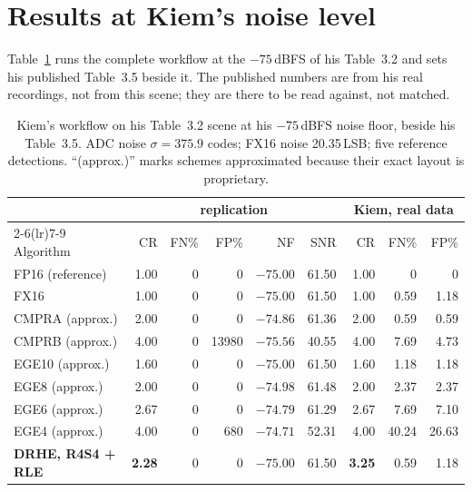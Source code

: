 \section{Results at Kiem's noise level}
\label{sec:kr_m75}

Table~\ref{tab:kr_m75} runs the complete workflow at the $-75$\,dBFS of his
Table~3.2 and sets his published Table~3.5 beside it. The published numbers are
from his real recordings, not from this scene; they are there to be read
against, not matched.

\begin{table}[htbp]
\centering
\caption[Replication at $-75$\,dBFS]{Kiem's workflow on his Table~3.2 scene at
his $-75$\,dBFS noise floor, beside his Table~3.5. ADC noise
$\sigma = 375.9$ codes; FX16 noise \num{20.35}\,LSB; five reference detections.
``(approx.)'' marks schemes approximated because their exact layout is
proprietary.}
\label{tab:kr_m75}
\footnotesize
\setlength{\tabcolsep}{3.5pt}
\begin{tabular}{@{}lrrrrr@{\hskip 12pt}rrr@{}}
\toprule
& \multicolumn{5}{c}{\textbf{replication}} & \multicolumn{3}{c}{\textbf{Kiem, real data}}\\
\cmidrule(lr){2-6}\cmidrule(lr){7-9}
Algorithm & CR & FN\% & FP\% & NF & SNR & CR & FN\% & FP\%\\
\midrule
FP16 (reference)                   & 1.00 & 0 & 0 & $-75.00$ & 61.50 & 1.00 & 0 & 0\\
FX16                               & 1.00 & 0 & 0 & $-75.00$ & 61.50 & 1.00 & 0.59 & 1.18\\
CMPRA (approx.)                    & 2.00 & 0 & 0 & $-74.86$ & 61.36 & 2.00 & 0.59 & 0.59\\
CMPRB (approx.)                    & 4.00 & 0 & 13980 & $-75.56$ & 40.55 & 4.00 & 7.69 & 4.73\\
EGE10 (approx.)                    & 1.60 & 0 & 0 & $-75.00$ & 61.50 & 1.60 & 1.18 & 1.18\\
EGE8 (approx.)                     & 2.00 & 0 & 0 & $-74.98$ & 61.48 & 2.00 & 2.37 & 2.37\\
EGE6 (approx.)                     & 2.67 & 0 & 0 & $-74.79$ & 61.29 & 2.67 & 7.69 & 7.10\\
EGE4 (approx.)                     & 4.00 & 0 & 680 & $-74.71$ & 52.31 & 4.00 & 40.24 & 26.63\\
\textbf{DRHE, R4S4 + RLE}          & \textbf{2.28} & 0 & 0 & $-75.00$ & 61.50 & \textbf{3.25} & 0.59 & 1.18\\

\end{tabular}
\end{table}
